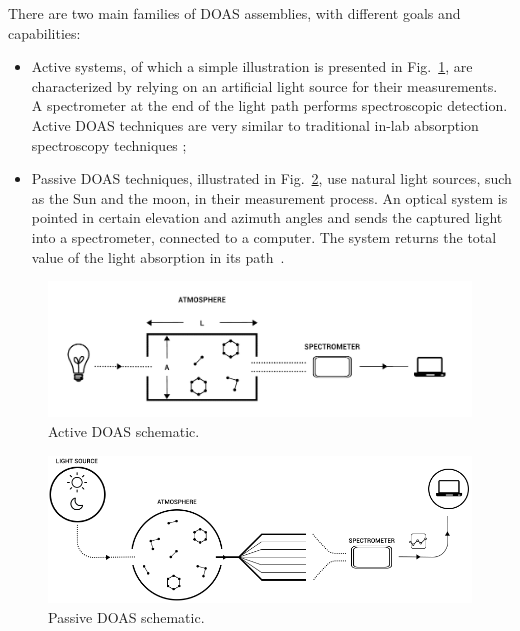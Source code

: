 There are two main families of \gls{DOAS} assemblies, with different
goals and capabilities:

\begin{itemize}

        \item Active systems, of which a simple illustration is
            presented in Fig.~\ref{fig:activeSmall}, are characterized
            by relying on an artificial light source for their
            measurements. A spectrometer at the end of the light path
            performs spectroscopic detection. Active DOAS techniques are
            very similar to traditional in-lab absorption spectroscopy
            techniques \cite{Platt2007};

        \item Passive DOAS techniques, illustrated in
            Fig.~\ref{fig:passiveSchematic}, use natural light sources,
            such as the Sun and the moon, in their measurement process.
            An optical system is pointed in certain elevation and
            azimuth angles and sends the captured light into a
            spectrometer, connected to a computer. The system returns
            the total value of the light absorption in its
            path~\cite{Platt2007,Merlaud2013}.

\end{itemize}

 \begin{figure}[t]
    \includegraphics[width=14cm]{img/amt-2016-314-f02.pdf}
    \caption{Active DOAS schematic.}\label{fig:activeSmall}
  \end{figure}

  \begin{figure}[t]
      \includegraphics[width=14cm]{img/amt-2016-314-f03.png}
      \caption{Passive DOAS schematic.}\label{fig:passiveSchematic}
  \end{figure}

